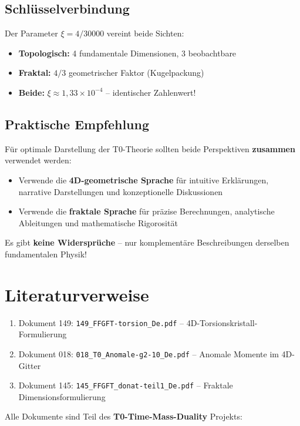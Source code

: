 	\subsection{Schlüsselverbindung}
	
	Der Parameter $\xi = 4/30000$ vereint beide Sichten:
	\begin{itemize}
		\item \textbf{Topologisch:} 4 fundamentale Dimensionen, 3 beobachtbare
		\item \textbf{Fraktal:} $4/3$ geometrischer Faktor (Kugelpackung)
		\item \textbf{Beide:} $\xi \approx 1{,}33 \times 10^{-4}$ -- identischer Zahlenwert!
	\end{itemize}
	
	\subsection{Praktische Empfehlung}
	
	\begin{important}
		Für optimale Darstellung der T0-Theorie sollten beide Perspektiven \textbf{zusammen} verwendet werden:
		
		\begin{itemize}
			\item Verwende die \textbf{4D-geometrische Sprache} für intuitive Erklärungen, narrative Darstellungen und konzeptionelle Diskussionen
			\item Verwende die \textbf{fraktale Sprache} für präzise Berechnungen, analytische Ableitungen und mathematische Rigorosität
		\end{itemize}
		
		Es gibt \textbf{keine Widersprüche} -- nur komplementäre Beschreibungen derselben fundamentalen Physik!
	\end{important}
	
	\section*{Literaturverweise}
	
	\begin{enumerate}
		\item Dokument 149: \texttt{149\_FFGFT-torsion\_De.pdf} -- 4D-Torsionskristall-Formulierung
		\item Dokument 018: \texttt{018\_T0\_Anomale-g2-10\_De.pdf} -- Anomale Momente im 4D-Gitter
		\item Dokument 145: \texttt{145\_FFGFT\_donat-teil1\_De.pdf} -- Fraktale Dimensionsformulierung
	\end{enumerate}
	
	Alle Dokumente sind Teil des \textbf{T0-Time-Mass-Duality} Projekts:\\

